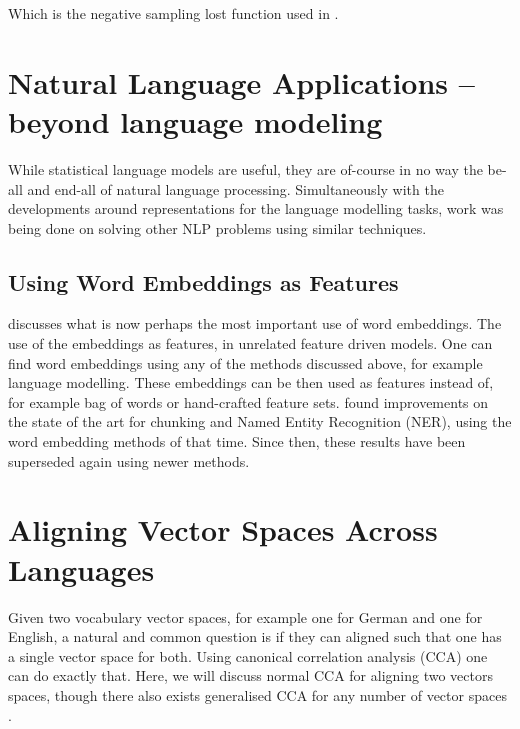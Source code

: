 \documentclass[parskip]{komatufte}
\begin{document}
Which is the negative sampling lost function used in  .







\section{Natural Language Applications -- beyond language modeling}
While statistical language models are useful, they are of-course in no way the be-all and end-all of natural language processing.
Simultaneously with the developments around representations for the language modelling tasks, work was being done on solving other NLP problems using similar techniques.



\subsection{Using Word Embeddings as Features}


 discusses what is now perhaps the most important use of word embeddings.
The use of the embeddings as features, in unrelated feature driven models.
One can find word embeddings using any of the methods discussed above, for example language modelling.
These embeddings can be then used as features instead of, for example bag of words or hand-crafted feature sets.
 found improvements on the state of the art for chunking and Named Entity Recognition (NER), using the word embedding methods of that time.
Since then, these results have been superseded again using newer methods.


\section{Aligning Vector Spaces Across Languages}
Given two vocabulary vector spaces, for example one for German and one for English,
a natural and common question is if they can aligned such that one has a single vector space for both.
Using canonical correlation analysis (CCA) one can do exactly that.
Here, we will discuss normal CCA for aligning two vectors spaces,
though there also exists generalised CCA for any number of vector spaces .
\end{document}
